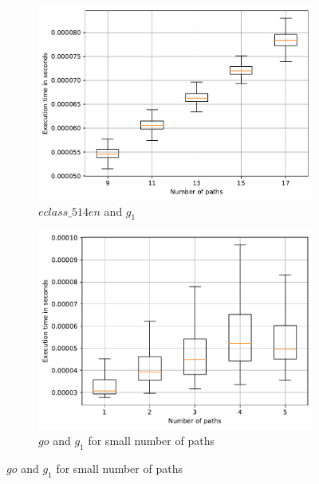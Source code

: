 \begin{figure}
	\begin{subfigure}{0.32\textwidth}
		\includegraphics[width=\linewidth,trim=0 0 -1.5cm 0]{pictures/allMatr_eclass_514en_10_small.pdf}
		\caption{$eclass\_514en$ and $g_1$} \label{fig:extractTimeEclassMtx}
	\end{subfigure}
	\hspace*{\fill} %
	\begin{subfigure}{0.32\textwidth}
		\includegraphics[width=\linewidth,trim=0 0 -1.5cm 0]{pictures/allMatr_go_10_small.pdf}
		\caption{$go$ and $g_1$ for small number of paths} \label{fig:extractTimeGoSmallMtx}
	\end{subfigure}
	\hspace*{\fill} %

\end{figure}
